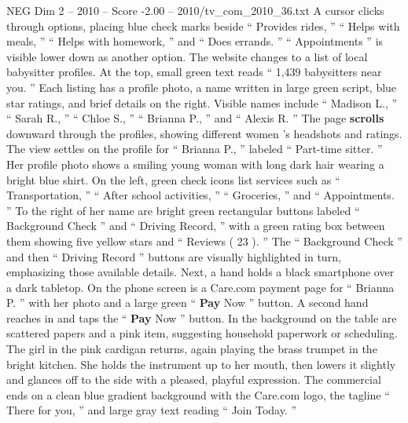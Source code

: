 \begin{textsample}{NEG Dim 2 – 2010 – Score -2.00 – 2010/tv\_com\_2010\_36.txt}
A cursor clicks through options, placing blue check marks beside “ Provides rides, ” “ Helps with meals, ” “ Helps with homework, ” and “ Does errands. ” “ Appointments ” is visible lower down as another option.
The website changes to a list of local babysitter profiles.
At the top, small green text reads “ 1,439 babysitters near you. ” Each listing has a profile photo, a name written in large green script, blue star ratings, and brief details on the right.
Visible names include “ Madison L., ” “ Sarah R., ” “ Chloe S., ” “ Brianna P., ” and “ Alexis R. ” The page \textbf{scrolls} downward through the profiles, showing different women ’s headshots and ratings.
The view settles on the profile for “ Brianna P., ” labeled “ Part-time sitter. ” Her profile photo shows a smiling young woman with long dark hair wearing a bright blue shirt.
On the left, green check icons list services such as “ Transportation, ” “ After school activities, ” “ Groceries, ” and “ Appointments. ” To the right of her name are bright green rectangular buttons labeled “ Background Check ” and “ Driving Record, ” with a green rating box between them showing five yellow stars and “ Reviews ( 23 ). ” The “ Background Check ” and then “ Driving Record ” buttons are visually highlighted in turn, emphasizing those available details.
Next, a hand holds a black smartphone over a dark tabletop.
On the phone screen is a Care.com payment page for “ Brianna P. ” with her photo and a large green “ \textbf{Pay} Now ” button.
A second hand reaches in and taps the “ \textbf{Pay} Now ” button.
In the background on the table are scattered papers and a pink item, suggesting household paperwork or scheduling.
The girl in the pink cardigan returns, again playing the brass trumpet in the bright kitchen.
She holds the instrument up to her mouth, then lowers it slightly and glances off to the side with a pleased, playful expression.
The commercial ends on a clean blue gradient background with the Care.com logo, the tagline “ There for you, ” and large gray text reading “ Join Today. ”

\end{textsample}
